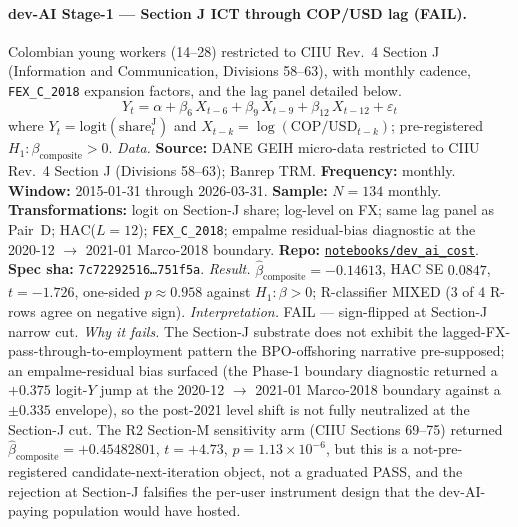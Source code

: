 \paragraph{dev-AI Stage-1 --- Section J ICT through COP/USD lag (FAIL).}
Colombian young workers (14--28) restricted to CIIU Rev.~4 Section J (Information and Communication, Divisions 58--63), with monthly cadence, \texttt{FEX\_C\_2018} expansion factors, and the lag panel detailed below.
\[ Y_t = \alpha + \beta_6\, X_{t-6} + \beta_9\, X_{t-9} + \beta_{12}\, X_{t-12} + \varepsilon_t \]
where \(Y_t = \mathrm{logit}(\mathrm{share}_t^{\mathrm{J}})\) and \(X_{t-k} = \log(\mathrm{COP}/\mathrm{USD}_{t-k})\); pre-registered \(H_1: \beta_{\mathrm{composite}} > 0\).
\textit{Data.} \textbf{Source:} DANE GEIH micro-data restricted to CIIU Rev.~4 Section J (Divisions 58--63); Banrep TRM. \textbf{Frequency:} monthly. \textbf{Window:} 2015-01-31 through 2026-03-31. \textbf{Sample:} \(N = 134\) monthly. \textbf{Transformations:} logit on Section-J share; log-level on FX; same lag panel as Pair~D; HAC(\(L=12\)); \texttt{FEX\_C\_2018}; empalme residual-bias diagnostic at the 2020-12 \(\to\) 2021-01 Marco-2018 boundary. \textbf{Repo:} \href{https://github.com/JMSBPP/abrigo-analytics/tree/master/notebooks/dev_ai_cost}{\texttt{notebooks/dev\_ai\_cost}}. \textbf{Spec sha:} \texttt{7c72292516\ldots 751f5a}.
\textit{Result.} \(\hat{\beta}_{\mathrm{composite}} = -0.14613\), HAC SE \(0.0847\), \(t = -1.726\), one-sided \(p \approx 0.958\) against \(H_1: \beta > 0\); R-classifier MIXED (3 of 4 R-rows agree on negative sign).
\textit{Interpretation.} FAIL --- sign-flipped at Section-J narrow cut.
\textit{Why it fails.} The Section-J substrate does not exhibit the lagged-FX-pass-through-to-employment pattern the BPO-offshoring narrative pre-supposed; an empalme-residual bias surfaced (the Phase-1 boundary diagnostic returned a \(+0.375\) logit-\(Y\) jump at the 2020-12 \(\to\) 2021-01 Marco-2018 boundary against a \(\pm 0.335\) envelope), so the post-2021 level shift is not fully neutralized at the Section-J cut. The R2 Section-M sensitivity arm (CIIU Sections 69--75) returned \(\hat{\beta}_{\mathrm{composite}} = +0.45482801\), \(t = +4.73\), \(p = 1.13 \times 10^{-6}\), but this is a not-pre-registered candidate-next-iteration object, not a graduated PASS, and the rejection at Section-J falsifies the per-user instrument design that the dev-AI-paying population would have hosted.

